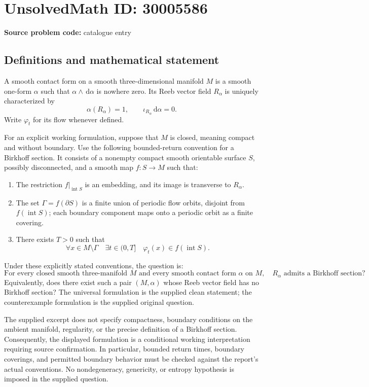 \documentclass[11pt]{article}
\newcommand{\dd}{\,\mathrm{d}}
\begin{document}
\section*{UnsolvedMath ID: 30005586}
\textbf{Source problem code:} catalogue entry
\subsection{Definitions and mathematical statement}
A smooth contact form on a smooth three-dimensional manifold \(M\) is a smooth one-form \(\alpha\) such that \(\alpha\wedge\dd\alpha\) is nowhere zero. Its Reeb vector field \(R_\alpha\) is uniquely characterized by
\[
\alpha(R_\alpha)=1,\qquad \iota_{R_\alpha}\dd\alpha=0.
\]
Write \(\varphi_t\) for its flow whenever defined.

For an explicit working formulation, suppose that \(M\) is closed, meaning compact and without boundary. Use the following bounded-return convention for a Birkhoff section. It consists of a nonempty compact smooth orientable surface \(S\), possibly disconnected, and a smooth map \(f:S\to M\) such that:
\begin{enumerate}
\item The restriction \(f|_{\operatorname{int}S}\) is an embedding, and its image is transverse to \(R_\alpha\).
\item The set \(\Gamma=f(\partial S)\) is a finite union of periodic flow orbits, disjoint from \(f(\operatorname{int}S)\); each boundary component maps onto a periodic orbit as a finite covering.
\item There exists \(T>0\) such that
\[
\forall x\in M\setminus\Gamma\quad\exists t\in(0,T]\quad
\varphi_t(x)\in f(\operatorname{int}S).
\]
\end{enumerate}
Under these explicitly stated conventions, the question is:
\[
\text{For every closed smooth three-manifold }M\text{ and every smooth contact form }\alpha\text{ on }M,
\quad R_\alpha\text{ admits a Birkhoff section?}
\]
Equivalently, does there exist such a pair \((M,\alpha)\) whose Reeb vector field has no Birkhoff section? The universal formulation is the supplied clean statement; the counterexample formulation is the supplied original question.

The supplied excerpt does not specify compactness, boundary conditions on the ambient manifold, regularity, or the precise definition of a Birkhoff section. Consequently, the displayed formulation is a conditional working interpretation requiring source confirmation. In particular, bounded return times, boundary coverings, and permitted boundary behavior must be checked against the report's actual conventions. No nondegeneracy, genericity, or entropy hypothesis is imposed in the supplied question.
\end{document}
